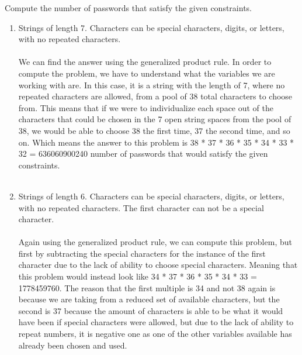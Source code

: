 Compute the number of passwords that satisfy the given constraints.
    \begin{enumerate}[label=(\roman*)]
    \item Strings of length 7. Characters can be special characters, digits, or letters, with no repeated characters.\\\\
We can find the answer using the generalized product rule. In order to compute the problem, we have to understand what the variables we are working with are. In this case, it is a string with the length of 7, where no repeated characters are allowed, from a pool of 38 total characters to choose from. This means that if we were to individualize each space out of the characters that could be chosen in the 7 open string spaces from the pool of 38, we would be able to choose 38 the first time, 37 the second time, and so on. Which means the answer to this problem is 38 * 37 * 36 * 35 * 34 * 33 * 32 = 636060900240 number of passwords that would satisfy the given constraints.
\\\\
    \item Strings of length 6. Characters can be special characters, digits, or letters, with no repeated characters. The first character can not be a special character.\\\\
Again using the generalized product rule, we can compute this problem, but first by subtracting the special characters for the instance of the first character due to the lack of ability to choose special characters. Meaning that this problem would instead look like 34 * 37 * 36 * 35 * 34 * 33 = 1778459760. The reason that the first multiple is 34 and not 38 again is because we are taking from a reduced set of available characters, but the second is 37 because the amount of characters is able to be what it would have been if special characters were allowed, but due to the lack of ability to repeat numbers, it is negative one as one of the other variables available has already been chosen and used.
      \end{enumerate}
 \newpage

